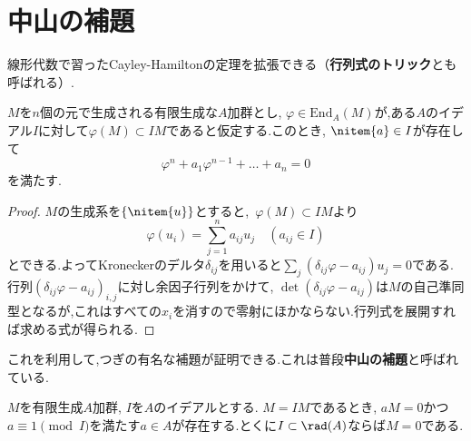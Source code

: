 

\section{中山の補題}

線形代数で習ったCayley-Hamiltonの定理を拡張できる（\textbf{行列式のトリック}とも呼ばれる）.
\begin{thm}
	\label{thm:Cayley-Hamilton}
	$M$を$n$個の元で生成される有限生成な$A$加群とし, $\varphi\in\text{End}_A(M)$が,ある$A$のイデアル$I$に対して$\varphi(M)\subset IM$であると仮定する.このとき, $\nitem{a}\in I$が存在して
	\[\varphi^n+a_1\varphi^{n-1}+\dots+a_n=0\]
	を満たす.
\end{thm}
\begin{proof}
	$M$の生成系を$\{\nitem{u}\}$とすると,~$\varphi(M)\subset IM$より
	\[\varphi(u_i)=\sum_{j=1}^n a_{ij}u_j\quad(a_{ij}\in I)\]
	とできる.よってKroneckerのデルタ$\delta_{ij}$を用いると$\sum_j(\delta_{ij}\varphi-a_{ij})u_j=0$である.行列$(\delta_{ij}\varphi-a_{ij})_{i,j}$に対し余因子行列をかけて, $\det(\delta_{ij}\varphi-a_{ij})$は$M$の自己準同型となるが,これはすべての$x_i$を消すので零射にほかならない.行列式を展開すれば求める式が得られる.
\end{proof}

これを利用して,つぎの有名な補題が証明できる.これは普段\textbf{中山の補題}と呼ばれている.
\begin{thm}[中山の補題]\label{thm:NAK}
	$M$を有限生成$A$加群, $I$を$A$のイデアルとする. $M=IM$であるとき, $aM=0$かつ$a\equiv1\pmod{I}$を満たす$a\in A$が存在する.とくに$I\subset\rad(A)$ならば$M=0$である.
\end{thm}

